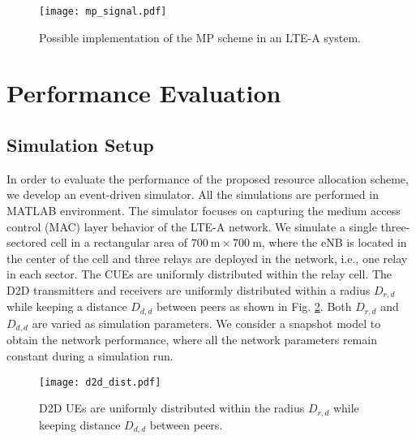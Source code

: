 \documentclass[twocolumn,10pt]{IEEEtran}
\begin{document}
\begin{figure}[!t]
\centering
\texttt{[image: mp\_signal.pdf]}
\caption{Possible implementation of the MP scheme in an LTE-A system.} 
\label{fig:mp_signal}
\end{figure}


\section{Performance Evaluation} \label{sec:performance}

\subsection{Simulation Setup}

In order to evaluate the performance of the proposed resource allocation scheme, we develop an event-driven simulator. All the simulations are performed in MATLAB environment. The simulator focuses on capturing the medium access control (MAC) layer behavior of the LTE-A network. We simulate a single three-sectored cell in a rectangular area of $700~\text{m} \times 700~\text{m}$, where the eNB is located in the center of the cell and three relays are deployed in the network, i.e., one relay in each sector. The CUEs are uniformly distributed within the relay cell. The D2D transmitters and receivers are uniformly distributed within a radius $D_{r,d}$ while keeping a distance $D_{d,d}$ between peers as shown in Fig. \ref{fig:d2d_position}.  Both $D_{r,d}$ and $D_{d,d}$ are varied as  simulation parameters. We consider a snapshot model to obtain the network performance, where all the network parameters remain constant during a simulation run. 




\begin{figure}[!h t b]
\centering
\texttt{[image: d2d\_dist.pdf]}
\caption{D2D UEs are uniformly distributed within the radius $D_{r,d}$ while keeping distance $D_{d,d}$ between peers.} 
\label{fig:d2d_position}
\end{figure}
\end{document}
